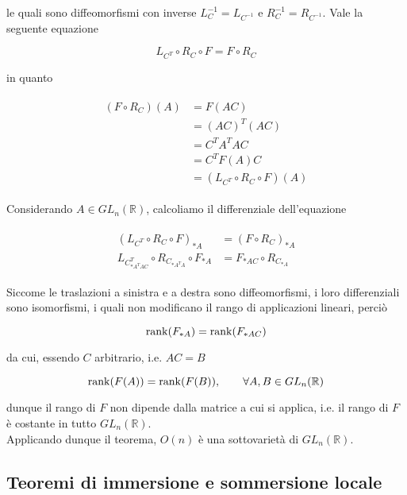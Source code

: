 le quali sono diffeomorfismi con inverse $ L_{C}^{-1} = L_{C^{-1}} $ e $ R_{C}^{-1} = R_{C^{-1}} $. Vale la seguente equazione

\begin{equation}
	L_{C^{T}} \circ R_{C} \circ F = F \circ R_{C}
\end{equation}

in quanto

\begin{align}
	\begin{split}
		(F \circ R_{C})(A) &= F(AC)\\
		&= (AC)^{T} (AC)\\
		&= C^{T} A^{T} A C\\
		&= C^{T} F(A) C\\
		&= (L_{C^{T}} \circ R_{C} \circ F)(A)
	\end{split}
\end{align}

Considerando $ A \in GL_{n}(\mathbb{R}) $, calcoliamo il differenziale dell'equazione

\begin{align}
	\begin{split}
		(L_{C^{T}} \circ R_{C} \circ F)_{*A} &= (F \circ R_{C})_{*A}\\
		L_{C^{T}_{*A^{T} A C}} \circ R_{C_{*A^{T} A}} \circ F_{*A} &= F_{*A C} \circ R_{C_{*A}}
	\end{split}
\end{align}

Siccome le traslazioni a sinistra e a destra sono diffeomorfismi, i loro differenziali sono isomorfismi, i quali non modificano il rango di applicazioni lineari, perciò

\begin{equation}
	\rank(F_{*A}) = \rank(F_{*A C})
\end{equation}

da cui, essendo $ C $ arbitrario, i.e. $ A C = B $

\begin{equation}
	\rank(F(A)) = \rank(F(B)), \qquad \forall A,B \in GL_{n}(\mathbb{R})
\end{equation}

dunque il rango di $ F $ non dipende dalla matrice a cui si applica, i.e. il rango di $ F $ è costante in tutto $ GL_{n}(\mathbb{R}) $.\\
Applicando dunque il teorema, $ O(n) $ è una sottovarietà di $ GL_{n}(\mathbb{R}) $.

\subsection{Teoremi di immersione e sommersione locale}

